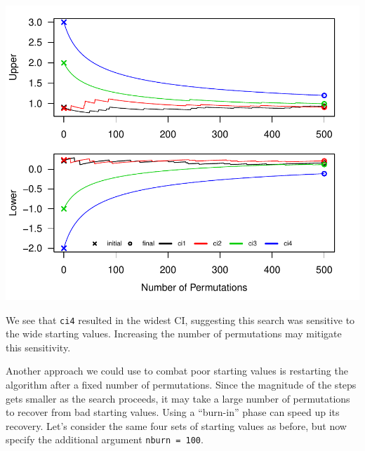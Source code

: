 \documentclass[12pt]{article}\usepackage[]{graphicx}\usepackage[]{color}
\makeatletter
\def\maxwidth{ %
  \ifdim\Gin@nat@width>\linewidth
    \linewidth
  \else
    \Gin@nat@width
  \fi
}
\newenvironment{knitrout}{}{} %
\makeatother
\begin{document}
\begin{knitrout}
\color{fgcolor}

{\centering \includegraphics[width=\maxwidth]{figure/ci_plots-1} 

}



\end{knitrout}
\noindent We see that \texttt{ci4} resulted in the widest CI, suggesting this search was sensitive to the wide starting values. Increasing the number of permutations may mitigate this sensitivity.

Another approach we could use to combat poor starting values is restarting the algorithm after a fixed number of permutations. Since the magnitude of the steps gets smaller as the search proceeds, it may take a large number of permutations to recover from bad starting values. Using a ``burn-in'' phase can speed up its recovery. Let's consider the same four sets of starting values as before, but now specify the additional argument \texttt{nburn = 100}.
\end{document}
